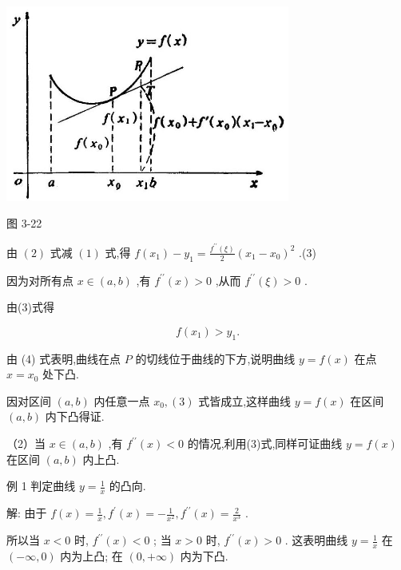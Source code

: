 \documentclass[lang=cn,newtx,12pt,scheme=chinese]{elegantbook}
\begin{document}
\begin{center}
\includegraphics[max width=0.7\textwidth]{images/01912c18-5c3f-733d-b775-749ba9897a9d_167_239614.jpg}
\end{center}

图 3-22

由 \(\left( 2\right)\) 式减 \(\left( 1\right)\) 式,得 \(f\left( {x}_{1}\right) - {y}_{1} = \frac{{f}^{\prime \prime }\left( \xi \right) }{2}{\left( {x}_{1} - {x}_{0}\right) }^{2}\) .(3)

因为对所有点 \(x \in \left( {a,b}\right)\) ,有 \({f}^{\prime \prime }\left( x\right) > 0\) ,从而 \({f}^{\prime \prime }\left( \xi \right) > 0\) .

由(3)式得

\[
f\left( {x}_{1}\right) > {y}_{1}\text{.} \tag{4}
\]

由 (4) 式表明,曲线在点 \(P\) 的切线位于曲线的下方,说明曲线 \(y = f\left( x\right)\) 在点 \(x = {x}_{0}\) 处下凸.

因对区间 \(\left( {a,b}\right)\) 内任意一点 \({x}_{0},\left( 3\right)\) 式皆成立,这样曲线 \(y = f\left( x\right)\) 在区间 \(\left( {a,b}\right)\) 内下凸得证.

（2）当 \(x \in \left( {a,b}\right)\) ,有 \({f}^{\prime \prime }\left( x\right) < 0\) 的情况,利用(3)式,同样可证曲线 \(y = f\left( x\right)\) 在区间 \(\left( {a,b}\right)\) 内上凸.

例 1 判定曲线 \(y = \frac{1}{x}\) 的凸向.

解: 由于 \(f\left( x\right) = \frac{1}{x},{f}^{\prime }\left( x\right) = - \frac{1}{{x}^{2}},{f}^{\prime \prime }\left( x\right) = \frac{2}{{x}^{3}}\) .

所以当 \(x < 0\) 时, \({f}^{\prime \prime }\left( x\right) < 0\) ; 当 \(x > 0\) 时, \({f}^{\prime \prime }\left( x\right) > 0\) . 这表明曲线 \(y = \frac{1}{x}\) 在 \(\left( {-\infty ,0}\right)\) 内为上凸; 在 \(\left( {0, + \infty }\right)\) 内为下凸.
\end{document}
